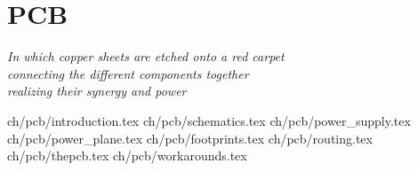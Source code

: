 \chapter {PCB}\label{ch:pcb}

\begin {flushright} {\slshape
    In which copper sheets are etched onto a red carpet\\
    connecting the different components together\\
    realizing their synergy and power
}
\end {flushright}

 {ch/pcb/introduction.tex}
 {ch/pcb/schematics.tex}
 {ch/pcb/power_supply.tex}
 {ch/pcb/power_plane.tex}
 {ch/pcb/footprints.tex}
 {ch/pcb/routing.tex}
 {ch/pcb/thepcb.tex}
 {ch/pcb/workarounds.tex}
